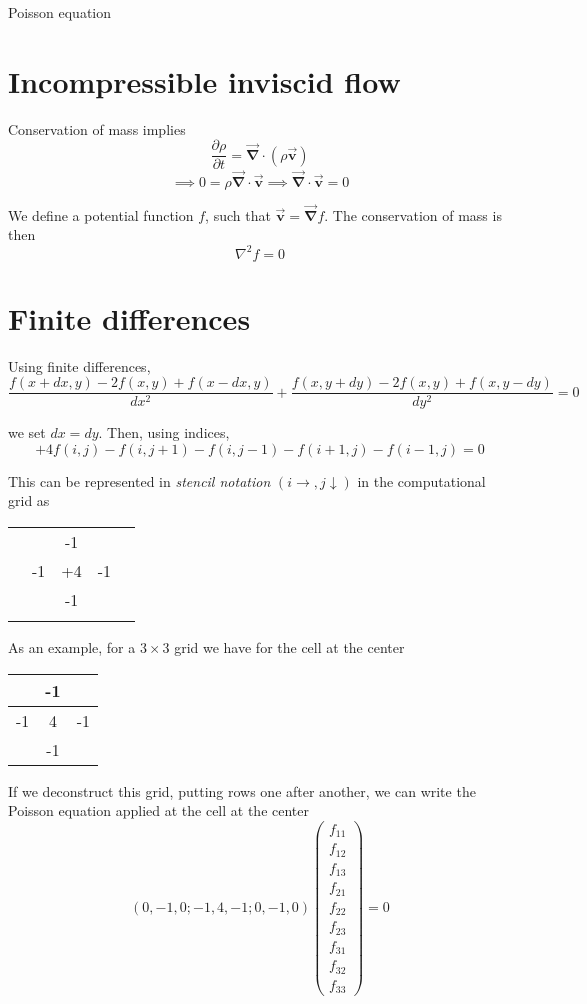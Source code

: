 \documentclass{article}
\let\toparrow\vec
\renewcommand{\vec}[1]{\toparrow{\mathbf{#1}}}
\begin{document}
{\huge Poisson equation}

\section{Incompressible inviscid flow}

Conservation of mass implies
\[ \frac{\partial\rho}{\partial t} = \vec \nabla \cdot (\rho \vec v)   \]
\[ \implies 0 = \rho \vec \nabla \cdot \vec v \implies \vec \nabla \cdot \vec v = 0 \]

We define a potential function $f$, such that $\vec v = \vec \nabla f$. The
conservation of mass is then
\[ \nabla^2 f = 0 \]

\section{Finite differences}

Using finite differences,
\[ \frac{f(x+dx,y)-2f(x,y)+f(x-dx,y)}{dx^2} + \frac{f(x,y+dy)-2f(x,y)+f(x,y-dy)}{dy^2} = 0 \]

we set $dx=dy$. Then, using indices,
\[ +4f(i,j) -f(i,j+1) - f(i,j-1) - f(i+1,j) - f(i-1,j) = 0 \]

This can be represented in \emph{stencil notation} $(i\rightarrow,j\downarrow)$ in the computational grid as

\begin{tabular}{c|c|c|c|c}
& & & & \\ \hline
& & -1 & & \\ \hline
& -1 & +4 & -1 & \\ \hline
& & -1 & & \\ \hline
& & & &
\end{tabular}

As an example, for a $3\times 3$ grid we have for the cell at the center

\begin{tabular}{|c|c|c|}
\hline
& -1 & \\ \hline
-1 & 4 & -1\\ \hline
& -1 & \\
\hline
\end{tabular}

If we deconstruct this grid, putting rows one after another,
we can write the Poisson equation applied at the cell at the center
\[ ( 0, -1, 0; -1, 4, -1; 0, -1, 0 )
\left(
\begin{matrix}
f_{11}\\
f_{12}\\
f_{13}\\
f_{21}\\
f_{22}\\
f_{23}\\
f_{31}\\
f_{32}\\
f_{33}
\end{matrix}
\right)
=
0
 \]
\end{document}
